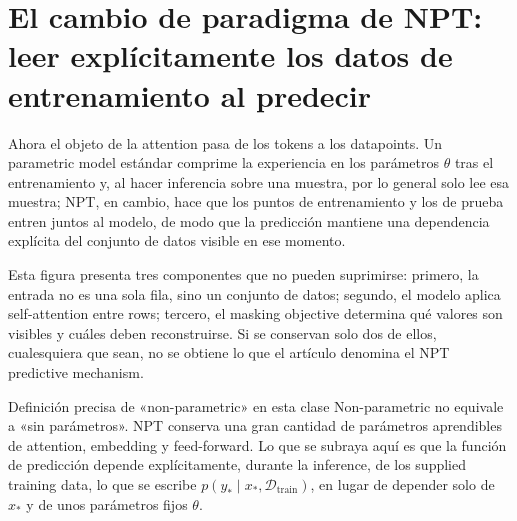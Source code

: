 \section{El cambio de paradigma de NPT: leer explícitamente los datos de entrenamiento al predecir}

Ahora el objeto de la attention pasa de los tokens a los datapoints. Un parametric model estándar comprime la experiencia en los parámetros $\theta$ tras el entrenamiento y, al hacer inferencia sobre una muestra, por lo general solo lee esa muestra; NPT, en cambio, hace que los puntos de entrenamiento y los de prueba entren juntos al modelo, de modo que la predicción mantiene una dependencia explícita del conjunto de datos visible en ese momento.


Esta figura presenta tres componentes que no pueden suprimirse: primero, la entrada no es una sola fila, sino un conjunto de datos; segundo, el modelo aplica self-attention entre rows; tercero, el masking objective determina qué valores son visibles y cuáles deben reconstruirse. Si se conservan solo dos de ellos, cualesquiera que sean, no se obtiene lo que el artículo denomina el NPT predictive mechanism.


\begin{importantbox}{Definición precisa de «non-parametric» en esta clase}
Non-parametric no equivale a «sin parámetros». NPT conserva una gran cantidad de parámetros aprendibles de attention, embedding y feed-forward. Lo que se subraya aquí es que la función de predicción depende explícitamente, durante la inference, de los supplied training data, lo que se escribe $p(y_*\mid x_*,\mathcal{D}_{\mathrm{train}})$, en lugar de depender solo de $x_*$ y de unos parámetros fijos $\theta$.
\end{importantbox}


